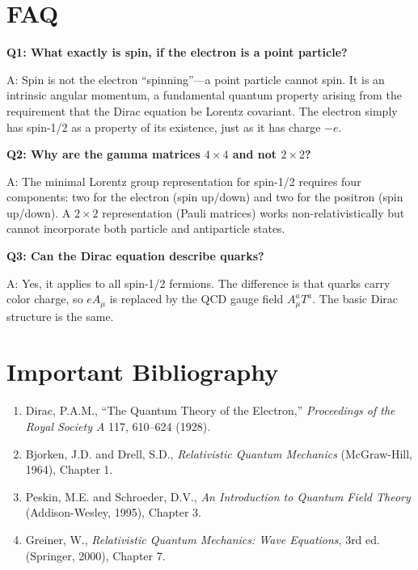 \section*{FAQ}

\textbf{Q1: What exactly is spin, if the electron is a point particle?}

A: Spin is not the electron ``spinning''---a point particle cannot spin. It is an intrinsic angular momentum, a fundamental quantum property arising from the requirement that the Dirac equation be Lorentz covariant. The electron simply has spin-1/2 as a property of its existence, just as it has charge $-e$.

\textbf{Q2: Why are the gamma matrices $4\times 4$ and not $2\times 2$?}

A: The minimal Lorentz group representation for spin-1/2 requires four components: two for the electron (spin up/down) and two for the positron (spin up/down). A $2\times 2$ representation (Pauli matrices) works non-relativistically but cannot incorporate both particle and antiparticle states.

\textbf{Q3: Can the Dirac equation describe quarks?}

A: Yes, it applies to all spin-1/2 fermions. The difference is that quarks carry color charge, so $eA_\mu$ is replaced by the QCD gauge field $A_\mu^a T^a$. The basic Dirac structure is the same.
\section*{Important Bibliography}

\begin{enumerate}
\item Dirac, P.A.M., ``The Quantum Theory of the Electron,'' \textit{Proceedings of the Royal Society A} 117, 610--624 (1928).
\item Bjorken, J.D. and Drell, S.D., \textit{Relativistic Quantum Mechanics} (McGraw-Hill, 1964), Chapter 1.
\item Peskin, M.E. and Schroeder, D.V., \textit{An Introduction to Quantum Field Theory} (Addison-Wesley, 1995), Chapter 3.
\item Greiner, W., \textit{Relativistic Quantum Mechanics: Wave Equations}, 3rd ed. (Springer, 2000), Chapter 7.
\end{enumerate}

